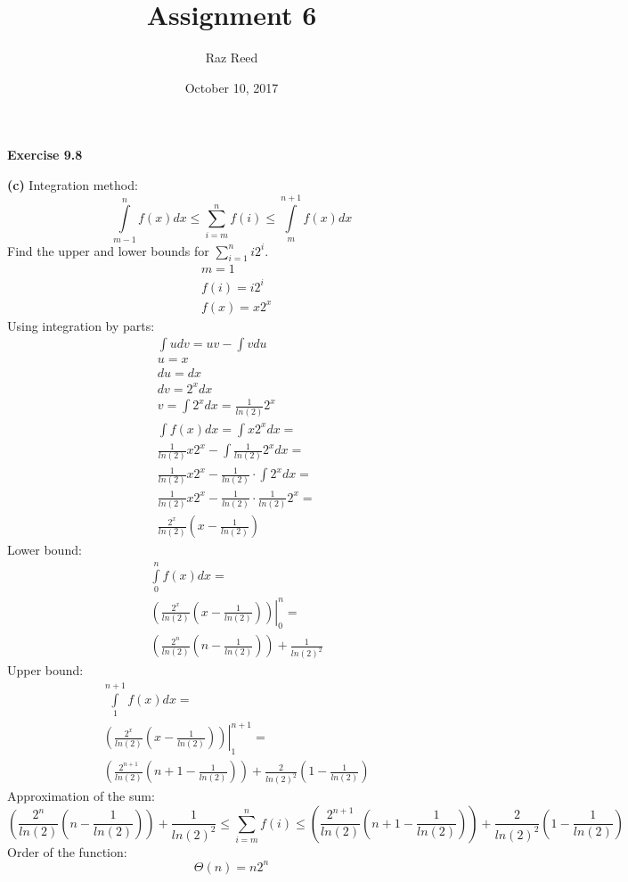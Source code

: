 \documentclass[fleqn]{article}
\title{Assignment 6}
\author{Raz Reed}
\date{October 10, 2017}
\begin{document}
\maketitle

\newpage
{\Large\bf Exercise 9.8}\vspace{1em}\par
\textbf{(c)} Integration method:
\begin{equation*}
	\int\limits_{m-1}^{n}f(x)dx \leq \sum\limits_{i=m}^{n}f(i) \leq \int\limits_{m}^{n+1}f(x)dx
\end{equation*}
Find the upper and lower bounds for $\sum\limits_{i=1}^{n}i2^i$.
\begin{align*}
	&m = 1\\
	&f(i) = i2^i\\
	&f(x) = x2^x
\end{align*}
Using integration by parts:
\begin{align*}
	&\int udv = uv - \int vdu\\
	&u = x \\&du = dx\\
	&dv = 2^xdx \\&v = \int 2^xdx = \frac{1}{ln(2)}2^x\\
	&\int f(x)dx = \int x2^xdx =\\
	&\frac{1}{ln(2)}x2^x - \int \frac{1}{ln(2)}2^xdx =\\
	&\frac{1}{ln(2)}x2^x - \frac{1}{ln(2)} \cdot \int 2^xdx =\\
	&\frac{1}{ln(2)}x2^x - \frac{1}{ln(2)} \cdot \frac{1}{ln(2)}2^x =\\
	&\frac{2^x}{ln(2)} \left(x-\frac{1}{ln(2)}\right)
\end{align*}
Lower bound:
\begin{align*}
	&\int\limits_{0}^{n}f(x)dx =\\
	&\left.\left(\frac{2^x}{ln(2)} \left(x-\frac{1}{ln(2)}\right)\right)\right|_0^n =\\
	&\left(\frac{2^n}{ln(2)} \left(n-\frac{1}{ln(2)}\right)\right) + \frac{1}{ln(2)^2}
\end{align*}
Upper bound:
\begin{align*}
	&\int\limits_{1}^{n+1}f(x)dx =\\
	&\left.\left(\frac{2^x}{ln(2)} \left(x-\frac{1}{ln(2)}\right)\right)\right|_1^{n+1} =\\
	&\left(\frac{2^{n+1}}{ln(2)} \left(n+1-\frac{1}{ln(2)}\right)\right) + \frac{2}{ln(2)^2}\left(1-\frac{1}{ln(2)}\right)
\end{align*}
Approximation of the sum:
\begin{equation*}
	\left(\frac{2^n}{ln(2)} \left(n-\frac{1}{ln(2)}\right)\right) + \frac{1}{ln(2)^2} \leq \sum\limits_{i=m}^{n}f(i) \leq \left(\frac{2^{n+1}}{ln(2)} \left(n+1-\frac{1}{ln(2)}\right)\right) + \frac{2}{ln(2)^2}\left(1-\frac{1}{ln(2)}\right)
\end{equation*}
Order of the function:
\begin{equation*}
	\Theta(n) = n2^n
\end{equation*}
\end{document}

